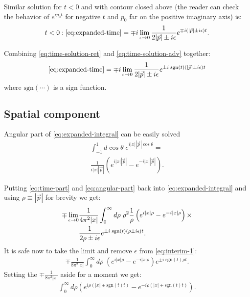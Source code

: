 \documentclass[aps,prd,final,twocolumn,floats,floatfix,nofootinbib,10pt]{revtex4-1}
\begin{document}
Similar solution for $t < 0$ and with contour closed above (the reader can check the behavior of
$e^{i p_0 t}$ for negative $t$ and $p_0$ far on the positive imaginary axis) is:
\begin{equation}\label{eq:time-solution-adv}
t < 0 : \eqref{eq:expanded-time} = \mp i \lim_{\epsilon \to 0} \frac{1}{2 |\vec{p}| \pm i \epsilon}
  e^{\mp i \left(|\vec{p}| \pm i \epsilon\right) t}.
\end{equation}

Combining \eqref{eq:time-solution-ret} and \eqref{eq:time-solution-adv} together:
\begin{equation}\label{eq:time-part}
\eqref{eq:expanded-time} = \mp i \lim_{\epsilon \to 0} \frac{1}{2 |\vec{p}| \pm i \epsilon}
  e^{\pm i \; \text{sgn}(t) \left(|\vec{p}| \pm i \epsilon\right) t}
\end{equation}
where $\text{sgn}(\cdots)$ is a sign function.

\subsection{Spatial component}

Angular part of \eqref{eq:expanded-integral} can be easily solved
\begin{align}
\int^{1}_{-1} d \cos{\theta} \; e^{i |x| |\vec{p}| \cos{\theta}} = \\
\frac{1}{i |x| |\vec{p}|} \left( e^{i |x| |\vec{p}|} - e^{-i |x| |\vec{p}|} \right). \label{eq:angular-part}
\end{align}

Putting \eqref{eq:time-part} and \eqref{eq:angular-part} back into \eqref{eq:expanded-integral} and using
$\rho \equiv |\vec{p}|$ for brevity we get:
\begin{align}
\mp \lim_{\epsilon \to 0}& \frac{1}{4 \pi^2 |x|} \int_0^\infty d \rho \; \rho^2 \frac{1}{\rho} \left( e^{i |x| \rho} - e^{-i |x| \rho} \right) \times \notag \\
& \frac{1}{2 \rho \pm i \epsilon} e^{\pm i \; \text{sgn}(t) \left(\rho \pm i \epsilon\right) t}. \label{eq:interim-1}
\end{align}
It is safe now to take the limit and remove $\epsilon$ from \eqref{eq:interim-1}:
\begin{align}
\mp \frac{1}{8 \pi^2 |x|} \int_0^\infty d \rho \; \left( e^{i |x| \rho} - e^{-i |x| \rho} \right) e^{\pm i \; \text{sgn}(t) \rho t}.
\end{align}
Setting the $\mp \frac{1}{8 \pi^2 |x|}$ aside for a moment we get:
\begin{align}
\int_0^\infty d \rho \left( e^{i \rho (|x| \pm \text{sgn}(t) t)} - e^{-i  \rho (|x|  \mp \text{sgn}(t) t)} \right).
\end{align}
\end{document}
